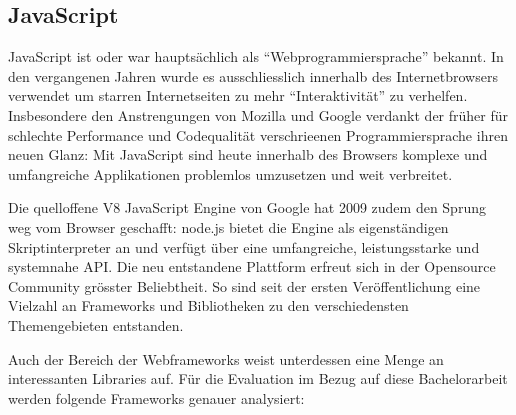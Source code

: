 \subsection{JavaScript}
\label{sec:technology-evaluation-javascript}

JavaScript ist oder war hauptsächlich als ``Webprogrammiersprache'' bekannt. In den vergangenen Jahren wurde es ausschliesslich innerhalb des Internetbrowsers verwendet um starren Internetseiten zu mehr ``Interaktivität'' zu verhelfen. Insbesondere den Anstrengungen von Mozilla \cite{SpiderMonkey} und Google \cite{V8JavaScript} verdankt der früher für schlechte Performance und Codequalität verschrieenen Programmiersprache ihren neuen Glanz: Mit JavaScript sind heute innerhalb des Browsers komplexe und umfangreiche Applikationen problemlos umzusetzen und weit verbreitet.

Die quelloffene V8 JavaScript Engine \cite{V8JavaScript} von Google hat 2009 zudem den Sprung weg vom Browser geschafft: node.js \cite{nodejs} bietet die Engine als eigenständigen Skriptinterpreter an und verfügt über eine umfangreiche, leistungsstarke und systemnahe API. Die neu entstandene Plattform erfreut sich in der Opensource Community grösster Beliebtheit. So sind seit der ersten Veröffentlichung eine Vielzahl an Frameworks und Bibliotheken zu den verschiedensten Themengebieten entstanden.

Auch der Bereich der Webframeworks weist unterdessen eine Menge an interessanten Libraries auf. Für die Evaluation im Bezug auf diese Bachelorarbeit werden folgende Frameworks genauer analysiert:

